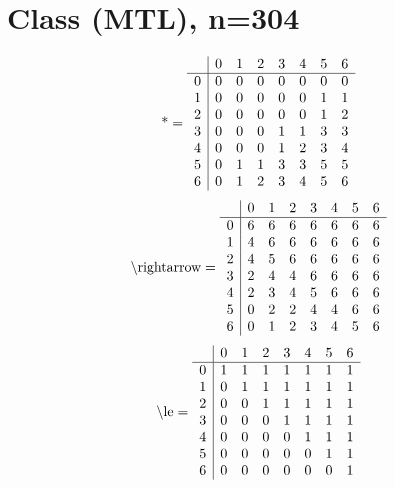 \documentclass[11pt]{article}
\begin{document}
\section{Class (MTL), n=304}
\[\text{*} = 
\begin{array}{r | r r r r r r r}
 & 0 & 1 & 2 & 3 & 4 & 5 & 6 \\ \hline
0 & 0 & 0 & 0 & 0 & 0 & 0 & 0 \\
1 & 0 & 0 & 0 & 0 & 0 & 1 & 1 \\
2 & 0 & 0 & 0 & 0 & 0 & 1 & 2 \\
3 & 0 & 0 & 0 & 1 & 1 & 3 & 3 \\
4 & 0 & 0 & 0 & 1 & 2 & 3 & 4 \\
5 & 0 & 1 & 1 & 3 & 3 & 5 & 5 \\
6 & 0 & 1 & 2 & 3 & 4 & 5 & 6 \\
\end{array}
\]
\[\text{\textbackslash rightarrow} = 
\begin{array}{r | r r r r r r r}
 & 0 & 1 & 2 & 3 & 4 & 5 & 6 \\ \hline
0 & 6 & 6 & 6 & 6 & 6 & 6 & 6 \\
1 & 4 & 6 & 6 & 6 & 6 & 6 & 6 \\
2 & 4 & 5 & 6 & 6 & 6 & 6 & 6 \\
3 & 2 & 4 & 4 & 6 & 6 & 6 & 6 \\
4 & 2 & 3 & 4 & 5 & 6 & 6 & 6 \\
5 & 0 & 2 & 2 & 4 & 4 & 6 & 6 \\
6 & 0 & 1 & 2 & 3 & 4 & 5 & 6 \\
\end{array}
\]
\[\text{\textbackslash le} = 
\begin{array}{r | r r r r r r r}
 & 0 & 1 & 2 & 3 & 4 & 5 & 6 \\ \hline
0 & 1 & 1 & 1 & 1 & 1 & 1 & 1 \\
1 & 0 & 1 & 1 & 1 & 1 & 1 & 1 \\
2 & 0 & 0 & 1 & 1 & 1 & 1 & 1 \\
3 & 0 & 0 & 0 & 1 & 1 & 1 & 1 \\
4 & 0 & 0 & 0 & 0 & 1 & 1 & 1 \\
5 & 0 & 0 & 0 & 0 & 0 & 1 & 1 \\
6 & 0 & 0 & 0 & 0 & 0 & 0 & 1 \\
\end{array}
\]
\end{document}
